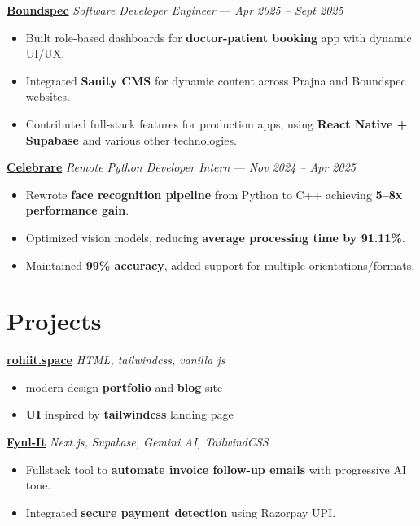 \documentclass[a4paper,10pt]{article}
\begin{document}
\noindent\textbf{\href{https://www.boundspec.com/}{Boundspec}} 
\hfill \textit{Software Developer Engineer} — \textit{Apr 2025 – Sept 2025}
\begin{itemize}
  \item Built role-based dashboards for \textbf{doctor-patient booking} app with dynamic UI/UX.
  \item Integrated \textbf{Sanity CMS} for dynamic content across Prajna and Boundspec websites.
  \item Contributed full-stack features for production apps, using \textbf{React Native + Supabase} and various other technologies.
\end{itemize}
\vspace{0.4em}

\noindent\textbf{\href{https://in.linkedin.com/company/celebrarecompany}{Celebrare}} 
\hfill \textit{Remote Python Developer Intern} — \textit{Nov 2024 – Apr 2025}
\begin{itemize}
  \item Rewrote \textbf{face recognition pipeline} from Python to C++ achieving \textbf{5–8x performance gain}.
  \item Optimized vision models, reducing \textbf{average processing time by 91.11\%}.
  \item Maintained \textbf{99\% accuracy}, added support for multiple orientations/formats.
\end{itemize}
\vspace{0.4em}

\section*{Projects}

\noindent\textbf{\href{https://www.rohiit.space/}{rohiit.space}} \hfill \textit{HTML, tailwindcss, vanilla js}
\begin{itemize}
  \item modern design \textbf{portfolio} and \textbf{blog} site
  \item \textbf{UI} inspired by \textbf{tailwindcss} landing page
\end{itemize}
\vspace{0.4em}

\noindent\textbf{\href{https://fynl-it.vercel.app/}{Fynl-It}} \hfill \textit{Next.js, Supabase, Gemini AI, TailwindCSS}
\begin{itemize}
  \item Fullstack tool to \textbf{automate invoice follow-up emails} with progressive AI tone.
  \item Integrated \textbf{secure payment detection} using Razorpay UPI.
\end{itemize}
\vspace{0.4em}
\end{document}
